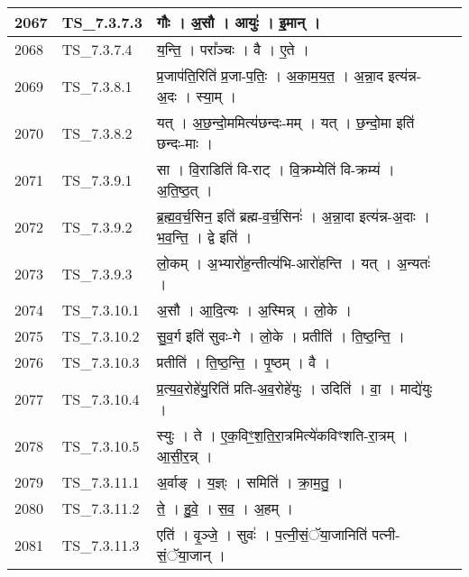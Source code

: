 \documentclass[17pt]{extarticle}
\begin{document}
\begin{longtable}{||p{0.4in}||p{0.9in}||p{4.0in}||p{0.9in}||}
        \hline
            2067 & TS\_7.3.7.3 & गौः   ।   अ॒सौ   ।   आयुः॑   ।   इ॒मान्   ।    &      \\
        \hline
            2068 & TS\_7.3.7.4 & य॒न्ति॒   ।   परा᳚ञ्चः   ।   वै   ।   ए॒ते   ।    &      \\
        \hline
            2069 & TS\_7.3.8.1 & प्र॒जाप॑ति॒रिति॑ प्र॒जा{-}प॒तिः॒   ।   अ॒का॒म॒य॒त॒   ।   अ॒न्ना॒द इत्य॑न्न{-}अ॒दः   ।   स्या॒म्   ।    &      \\
        \hline
            2070 & TS\_7.3.8.2 & यत्   ।   अ॒छ॒न्दो॒ममित्य॑छन्दः{-}मम्   ।   यत्   ।   छ॒न्दो॒मा इति॑ छन्दः{-}माः   ।    &      \\
        \hline
            2071 & TS\_7.3.9.1 & सा   ।   वि॒राडिति॑ वि{-}राट्   ।   वि॒क्रम्येति॑ वि{-}क्रम्य॑   ।   अ॒ति॒ष्ठ॒त्   ।    &      \\
        \hline
            2072 & TS\_7.3.9.2 & ब्र॒ह्म॒व॒र्च॒सिन॒ इति॑ ब्रह्म{-}व॒र्च॒सिनः॑   ।   अ॒न्ना॒दा इत्य॑न्न{-}अ॒दाः   ।   भ॒व॒न्ति॒   ।   द्वे इति॑   ।    &      \\
        \hline
            2073 & TS\_7.3.9.3 & लो॒कम्   ।   अ॒भ्यारो॑ह॒न्तीत्य॑भि{-}आरो॑हन्ति   ।   यत्   ।   अ॒न्यतः॑   ।    &      \\
        \hline
            2074 & TS\_7.3.10.1 & अ॒सौ   ।   आ॒दि॒त्यः   ।   अ॒स्मिन्न्   ।   लो॒के   ।    &      \\
        \hline
            2075 & TS\_7.3.10.2 & सु॒व॒र्ग इति॑ सुवः{-}गे   ।   लो॒के   ।   प्रतीति॑   ।   ति॒ष्ठ॒न्ति॒   ।    &      \\
        \hline
            2076 & TS\_7.3.10.3 & प्रतीति॑   ।   ति॒ष्ठ॒न्ति॒   ।   पृ॒ष्ठम्   ।   वै   ।    &      \\
        \hline
            2077 & TS\_7.3.10.4 & प्र॒त्य॒व॒रोहे॑यु॒रिति॑ प्रति{-}अ॒व॒रोहे॑युः   ।   उदिति॑   ।   वा॒   ।   माद्ये॑युः   ।    &      \\
        \hline
            2078 & TS\_7.3.10.5 & स्युः   ।   ते   ।   ए॒क॒विꣳ॒॒श॒ति॒रा॒त्रमित्ये॑कविꣳशति{-}रा॒त्रम्   ।   आ॒सी॒र॒न्न्   ।    &      \\
        \hline
            2079 & TS\_7.3.11.1 & अ॒र्वाङ्   ।   य॒ज्ञ्ः   ।   समिति॑   ।   क्रा॒म॒तु॒   ।    &      \\
        \hline
            2080 & TS\_7.3.11.2 & ते॒   ।   हु॒वे॒   ।   स॒व॒   ।   अ॒हम्   ।    &      \\
        \hline
            2081 & TS\_7.3.11.3 & एति॑   ।   वृ॒ञ्जे॒   ।   सुवः॑   ।   प॒त्नी॒सं॒ॅया॒जानिति॑ पत्नी{-}सं॒ॅया॒जान्   ।    &      \\

\end{longtable}
\end{document}
